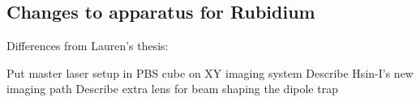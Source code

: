 
\subsection{Changes to apparatus for Rubidium}\label{sec:BECchanges}

Differences from Lauren's thesis:

    Put master laser setup in
    PBS cube on XY imaging system
    Describe Hsin-I's new imaging path
    Describe extra lens for beam shaping the dipole trap

